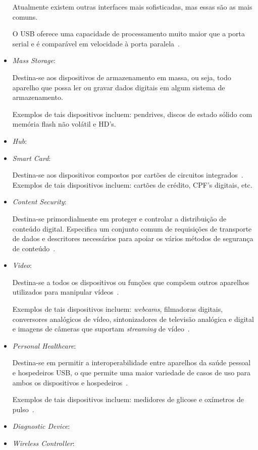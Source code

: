 \begin{itemize}
	Atualmente existem outras interfaces mais sofisticadas, mas essas são as mais comuns.

	O USB oferece uma capacidade de processamento muito maior que a porta serial e é comparável em velocidade à porta paralela~\cite{usbprintclass}.
	\item \emph{Mass Storage}: 

	Destina-se aos dispositivos de armazenamento em massa, ou seja, todo aparelho que possa ler ou gravar dados digitais em algum sistema de armazenamento.

	Exemplos de tais dispositivos incluem: pendrives, discos de estado sólido com memória flash não volátil e HD's.
	\item \emph{Hub}: 
	\item \emph{Smart Card}: 

	Destina-se aos dispositivos compostos por cartões de circuitos integrados~\cite{usbsmartcard}.
	Exemplos de tais dispositivos incluem: cartões de crédito, CPF's digitais, etc.
	\item \emph{Content Security}: 

	Destina-se primordialmente em proteger e controlar a distribuição de conteúdo digital. Especifica um conjunto comum de requisições de transporte de dados e descritores necessários para apoiar os vários métodos de segurança de conteúdo~\cite{usbcontentsecurityclass}.
	\item \emph{Video}: 

	Destina-se a todos os dispositivos ou funções que compõem outros aparelhos utilizados para manipular vídeos~\cite{usbvideoclass}.

	Exemplos de tais dispositivos incluem: \emph{webcams}, filmadoras digitais, conversores analógicos de vídeo, sintonizadores de televisão analógica e digital e imagens de câmeras que suportam \emph{streaming} de vídeo~\cite{usbvideoclass}.
	\item \emph{Personal Healthcare}: 

	Destina-se em permitir a interoperabilidade entre aparelhos da saúde pessoal e hospedeiros USB, o que permite uma maior variedade de casos de uso para ambos os dispositivos e hospedeiros~\cite{usbhealthcareclass}.

	Exemplos de tais dispositivos incluem: medidores de glicose e oxímetros de pulso~\cite{usbhealthcareclass}.
	\item \emph{Diagnostic Device}: 
	\item \emph{Wireless Controller}: 


\end{itemize}
